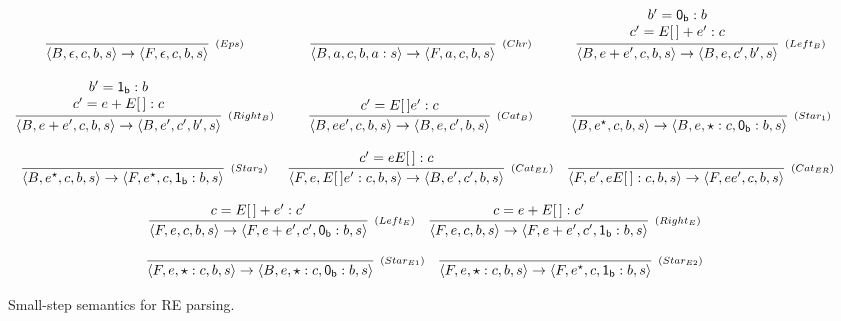 \documentclass[sigplan]{acmart}
\theoremstyle{definition}
\newcommand{\C}[1]{\red{\mathsf{#1}}}
\newcommand{\conf}[1]{\ensuremath{\langle #1 \rangle}}
\begin{document}
\begin{figure}[h]
  \[
     \begin{array}{ccc}
        \infer[_{(Eps)}]{\conf{B,\epsilon,c,b,s} \to \conf{F,\epsilon,c,b,s}}{}
        &
        \infer[_{(Chr)}]{\conf{B,a,c,b,a:s} \to \conf{F,a,c,b,s}}{}
        &
        \infer[_{(Left_B)}]{\conf{B,e+e',c,b,s}\to\conf{B,e,c',b',s}}
              {\begin{array}{c}
                 b' = \ensuremath{\C{0_b}} : b\\
                 c' = E[\,]+e' : c \\
               \end{array}}
        \\ \\
        \infer[_{(Right_B)}]{\conf{B,e+e',c,b,s}\to\conf{B,e',c',b',s}}
              {\begin{array}{c}
                 b' = \ensuremath{\C{1_b}} : b\\
                 c' = e + E[\,] : c \\
               \end{array}}
        &
        \infer[_{(Cat_B)}]{\conf{B,ee',c,b,s}\to\conf{B,e,c',b,s}}
              {c' = E[\,]e' : c}
        &
        \infer[_{(Star_1)}]{\conf{B,e^\star,c,b,s}\to\conf{B,e,\star : c, \ensuremath{\C{0_b}} : b, s}}{}
        \\ \\
        \infer[_{(Star_2)}]{\conf{B,e^\star,c,b,s}\to\conf{F,e^\star, c, \ensuremath{\C{1_b}} : b, s}}{}
        &
        \infer[_{(Cat_{EL})}]{\conf{F,e,E[\,]e':c,b,s}\to\conf{B,e',c',b,s}}{c'=eE[\,]:c}
        &
        \infer[_{(Cat_{ER})}]{\conf{F,e',eE[\,]:c,b,s}\to\conf{F,ee',c,b,s}}{}
        \\ \\
        \multicolumn{3}{c}{
            \begin{array}{cc}
               \infer[_{(Left_E)}]{\conf{F,e,c,b,s}\to\conf{F,e+e',c',\ensuremath{\C{0_b}}:b,s}}{c = E[\,]+e' : c'}
            &
               \infer[_{(Right_E)}]{\conf{F,e,c,b,s}\to\conf{F,e+e',c',\ensuremath{\C{1_b}}:b,s}}{c = e + E[\,] : c'}
            \end{array}}
        \\ \\
        \multicolumn{3}{c}{
           \begin{array}{cc}
              \infer[_{(Star_{E1})}]{\conf{F,e,\star:c,b,s}\to\conf{B,e,\star:c,\ensuremath{\C{0_b}}:b,s}}{}
              &
              \infer[_{(Star_{E2})}]{\conf{F,e,\star:c,b,s}\to\conf{F,e^\star,c,\ensuremath{\C{1_b}}:b,s}}{}
           \end{array}
        }
     \end{array}
  \]
  \centering
  \caption{Small-step semantics for RE parsing.}
  \label{figure:smallstep}
\end{figure}
\end{document}
